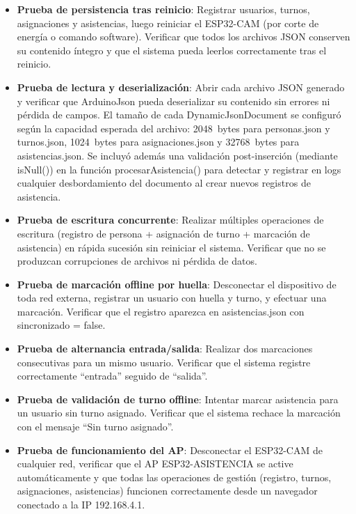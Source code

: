 \begin{itemize}
    \item \textbf{Prueba de persistencia tras reinicio}: Registrar usuarios, turnos, asignaciones y asistencias, luego reiniciar el ESP32-CAM (por corte de energía o comando software). Verificar que todos los archivos JSON conserven su contenido íntegro y que el sistema pueda leerlos correctamente tras el reinicio.

    \item \textbf{Prueba de lectura y deserialización}: Abrir cada archivo JSON generado y verificar que ArduinoJson pueda deserializar su contenido sin errores ni pérdida de campos. El tamaño de cada DynamicJsonDocument se configuró según la capacidad esperada del archivo: 2048~bytes para personas.json y turnos.json, 1024~bytes para asignaciones.json y 32768~bytes para asistencias.json. Se incluyó además una validación post-inserción (mediante isNull()) en la función procesarAsistencia() para detectar y registrar en logs cualquier desbordamiento del documento al crear nuevos registros de asistencia.

    \item \textbf{Prueba de escritura concurrente}: Realizar múltiples operaciones de escritura (registro de persona + asignación de turno + marcación de asistencia) en rápida sucesión sin reiniciar el sistema. Verificar que no se produzcan corrupciones de archivos ni pérdida de datos.

    \item \textbf{Prueba de marcación offline por huella}: Desconectar el dispositivo de toda red externa, registrar un usuario con huella y turno, y efectuar una marcación. Verificar que el registro aparezca en asistencias.json con sincronizado = false.

    \item \textbf{Prueba de alternancia entrada/salida}: Realizar dos marcaciones consecutivas para un mismo usuario. Verificar que el sistema registre correctamente ``entrada'' seguido de ``salida''.

    \item \textbf{Prueba de validación de turno offline}: Intentar marcar asistencia para un usuario sin turno asignado. Verificar que el sistema rechace la marcación con el mensaje ``Sin turno asignado''.

    \item \textbf{Prueba de funcionamiento del AP}: Desconectar el ESP32-CAM de cualquier red, verificar que el AP ESP32-ASISTENCIA se active automáticamente y que todas las operaciones de gestión (registro, turnos, asignaciones, asistencias) funcionen correctamente desde un navegador conectado a la IP 192.168.4.1.
\end{itemize}

